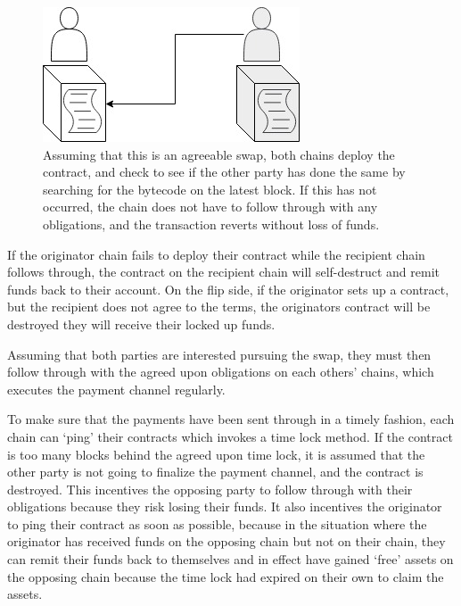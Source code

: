 \documentclass{%
	article}
\begin{document}
\begin{figure}[htbp!]
\centering
\includegraphics[scale=0.5]{fig4.jpg}
\caption{Assuming that this is an agreeable swap, both chains deploy the contract, and check to see if the other party has done the same by searching for the bytecode on the latest block. If this has not occurred, the chain does not have to follow through with any obligations, and the transaction reverts without loss of funds.}
\end{figure}

If the originator chain fails to deploy their contract while the recipient chain follows through, the contract on the recipient chain will self-destruct and remit funds back to their account. On the flip side, if the originator sets up a contract, but the recipient does not agree to the terms, the originators contract will be destroyed they will receive their locked up funds. 
	
Assuming that both parties are interested pursuing the swap, they must then follow through with the agreed upon obligations on each others’ chains, which executes the payment channel regularly.

To make sure that the payments have been sent through in a timely fashion, each chain can ‘ping’ their contracts which invokes a time lock method. If the contract is too many blocks behind the agreed upon time lock, it is assumed that the other party is not going to finalize the payment channel, and the contract is destroyed. This incentives the opposing party to follow through with their obligations because they risk losing their funds. It also incentives the originator to ping their contract as soon as possible, because in the situation where the originator has received funds on the opposing chain but not on their chain, they can remit their funds back to themselves and in effect have gained ‘free’ assets on the opposing chain because the time lock had expired on their own to claim the assets.
\end{document}
